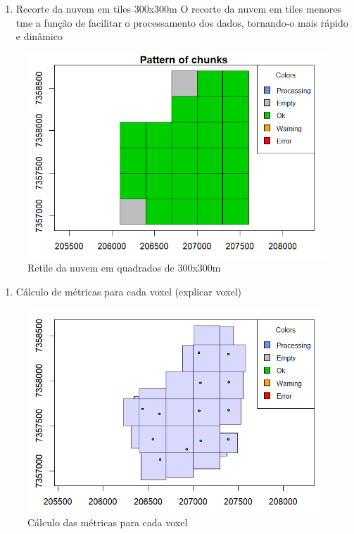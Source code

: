 \documentclass[
]{article}
\providecommand{\tightlist}{%
  \setlength{\itemsep}{0pt}\setlength{\parskip}{0pt}}
\begin{document}
\newpage

\begin{enumerate}
\def\labelenumi{\arabic{enumi}.}
\setcounter{enumi}{9}
\tightlist
\item
  Recorte da nuvem em tiles 300x300m O recorte da nuvem em tiles menores
  tme a função de facilitar o processamento dos dados, tornando-o mais
  rápido e dinâmico
\end{enumerate}

\begin{figure}

{\centering \includegraphics[width=0.5\linewidth]{IMAGES/Retile} 

}

\caption{Retile da nuvem em quadrados de 300x300m}\label{fig:unnamed-chunk-15}
\end{figure}

\newpage

\begin{enumerate}
\def\labelenumi{\arabic{enumi}.}
\setcounter{enumi}{10}
\tightlist
\item
  Cálculo de métricas para cada voxel (explicar voxel)
\end{enumerate}

\begin{figure}

{\centering \includegraphics[width=0.5\linewidth]{IMAGES/calculo-metricas-voxel} 

}

\caption{Cálculo das métricas para cada voxel}\label{fig:unnamed-chunk-16}
\end{figure}
\newpage
\end{document}
